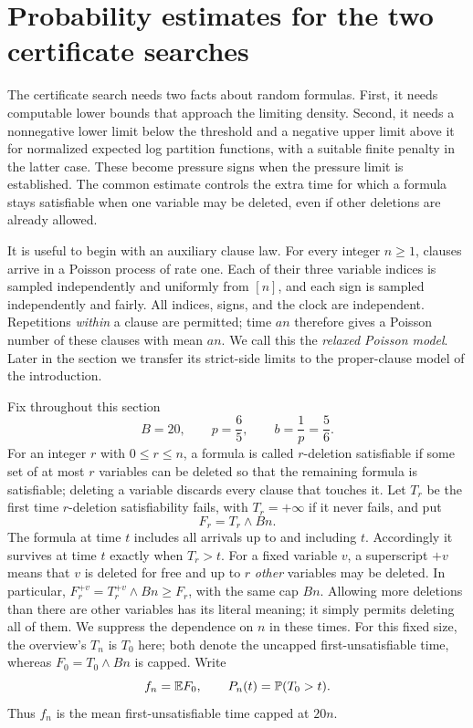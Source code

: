 \section{Probability estimates for the two certificate searches}
\label{cp:section}

The certificate search needs two facts about random formulas. First, it
needs computable lower bounds that approach the limiting density. Second,
it needs a nonnegative lower limit below the threshold and a negative
upper limit above it for normalized expected log partition functions,
with a suitable finite penalty in the latter case. These become pressure
signs when the pressure limit is established. The common
estimate controls the extra time for which a formula stays satisfiable
when one variable may be deleted, even if other deletions are already
allowed.

It is useful to begin with an auxiliary clause law. For every integer
$n\ge1$, clauses arrive in a Poisson process of rate one. Each of their three variable
indices is sampled independently and uniformly from $[n]$, and each sign
is sampled independently and fairly. All indices, signs, and the clock
are independent. Repetitions \emph{within} a clause are permitted; time
$an$ therefore gives a Poisson number of these clauses with mean $an$.
We call this the \emph{relaxed Poisson model}. Later in the section we
transfer its strict-side limits to the proper-clause model of the
introduction.

Fix throughout this section
\begin{equation}\label{cp:constants}
 B=20,\qquad p=\frac65,\qquad b=\frac1p=\frac56.
\end{equation}
For an integer $r$ with $0\le r\le n$, a formula is called $r$-deletion satisfiable if some set
of at most $r$ variables can be deleted so that the remaining formula is
satisfiable; deleting a variable discards every clause that touches it.
Let $T_r$ be the first time $r$-deletion satisfiability fails, with
$T_r=+\infty$ if it never fails, and put
\[
 F_r=T_r\wedge Bn.
\]
The formula at time $t$ includes all arrivals up to and including $t$.
Accordingly it survives at time $t$ exactly when $T_r>t$. For a fixed
variable $v$, a superscript $+v$ means that $v$ is deleted for free and up
to $r$ \emph{other} variables may be deleted. In particular,
$F_r^{+v}=T_r^{+v}\wedge Bn\ge F_r$, with the same cap $Bn$.
Allowing more deletions than there are other variables
has its literal meaning; it simply permits deleting all of them.
We suppress the dependence on $n$ in these times.  For this fixed size,
the overview's $T_n$ is $T_0$ here; both denote the uncapped first-unsatisfiable
time, whereas $F_0=T_0\wedge Bn$ is capped.  Write
\[
 f_n=\mathbb E F_0,\qquad P_n(t)=\mathbb P(T_0>t).
\]
Thus $f_n$ is the mean first-unsatisfiable time capped at $20n$.

